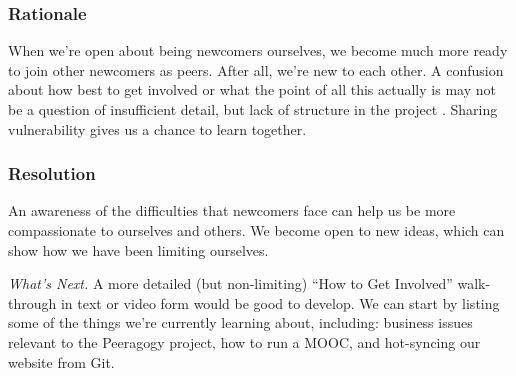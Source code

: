 \subsubsection*{Rationale} 
When we're open about being newcomers ourselves, we become much more
ready to join other newcomers as peers.  After all, we're new to each other.  A
 confusion about how best to get involved
or what the point of all this actually is may not be a question of
insufficient detail, but lack of structure in the project
.  Sharing vulnerability gives us a chance to learn together.
%

\subsubsection*{Resolution}
An awareness of the difficulties that newcomers face can
help us be more compassionate to ourselves and others.  We
become open to new ideas, which can show how we have
been limiting ourselves.

\begin{framed}
\emph{What's Next.}
A more detailed (but non-limiting) ``How to Get Involved'' walk-through in text or video form would be good to develop. We can start by listing some of the things we're currently learning about, including: business issues relevant to the Peeragogy project, how to run a MOOC, and hot-syncing our website from Git.
\end{framed}


